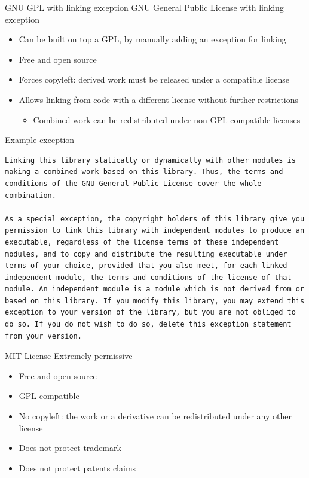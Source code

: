 \documentclass[presentation]{beamer}
\begin{document}
\begin{frame}{GNU GPL with linking exception}
    GNU General Public License with linking exception
    \begin{itemize}
        \item Can be built on top a GPL, by manually adding an exception for linking
        \item Free and open source
        \item Forces copyleft: derived work must be released under a compatible license
        \item Allows linking from code with a different license without further restrictions
        \begin{itemize}
            \item Combined work can be redistributed under non GPL-compatible licenses
        \end{itemize}
    \end{itemize}
    \begin{block}{Example exception}
         \begin{verbatim}
Linking this library statically or dynamically with other modules is making a combined work based on this library. Thus, the terms and conditions of the GNU General Public License cover the whole combination.

As a special exception, the copyright holders of this library give you permission to link this library with independent modules to produce an executable, regardless of the license terms of these independent modules, and to copy and distribute the resulting executable under terms of your choice, provided that you also meet, for each linked independent module, the terms and conditions of the license of that module. An independent module is a module which is not derived from or based on this library. If you modify this library, you may extend this exception to your version of the library, but you are not obliged to do so. If you do not wish to do so, delete this exception statement from your version.
         \end{verbatim}
    \end{block}
\end{frame}

\begin{frame}{MIT License}
    Extremely permissive
    \begin{itemize}
        \item Free and open source
        \item GPL compatible
        \item No copyleft: the work or a derivative can be redistributed under any other license
        \item Does not protect trademark
        \item Does not protect patents claims
    \end{itemize}
\end{frame}
\end{document}
